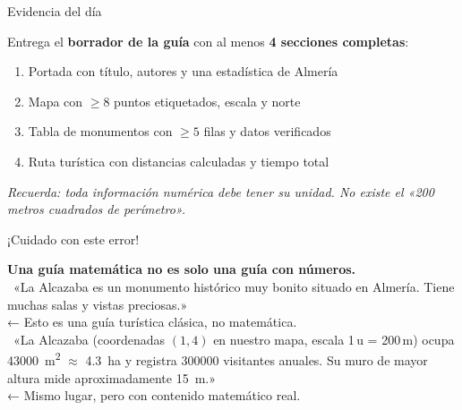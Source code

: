 \documentclass[aspectratio=169, 10pt, spanish]{beamer}
\begin{document}
\begin{frame}{Evidencia del día}
  \begin{evidenciabox}
    Entrega el \textbf{borrador de la guía} con al menos
    \textbf{4 secciones completas}:
    \begin{enumerate}
      \item Portada con título, autores y una estadística de Almería
      \item Mapa con $\geq 8$ puntos etiquetados, escala y norte
      \item Tabla de monumentos con $\geq 5$ filas y datos verificados
      \item Ruta turística con distancias calculadas y tiempo total
    \end{enumerate}
    \vspace{4pt}
    \textit{Recuerda: toda información numérica debe
    tener su unidad. No existe el «200 metros cuadrados
    de perímetro».}
  \end{evidenciabox}
\end{frame}

\begin{frame}{¡Cuidado con este error!}
  \begin{errorbox}
    \textbf{Una guía matemática no es solo una guía con números.}\\[6pt]
    \incorrecto\ «La Alcazaba es un monumento histórico muy bonito
    situado en Almería. Tiene muchas salas y vistas preciosas.»\\
    {\AlmFontFootnote ← Esto es una guía turística clásica, no matemática.}\\[8pt]
    \correcto\ «La Alcazaba (coordenadas $(1,4)$ en nuestro mapa,
    escala 1\,u = 200\,m) ocupa \SI{43000}{m^2} $\approx$ \SI{4.3}{ha}
    y registra \num{300000} visitantes anuales. Su muro de mayor altura
    mide aproximadamente \SI{15}{m}.»\\
    {\AlmFontFootnote ← Mismo lugar, pero con contenido matemático real.}
  \end{errorbox}
\end{frame}
\end{document}
